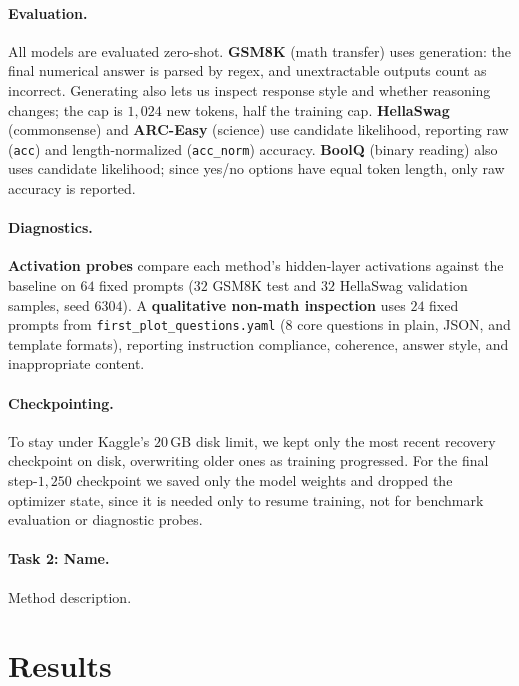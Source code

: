 \documentclass{article}
\begin{document}
\paragraph{Evaluation.}
All models are evaluated zero-shot. \textbf{GSM8K} (math transfer) uses generation: the final numerical answer is parsed by regex, and unextractable outputs count as incorrect. Generating also lets us inspect response style and whether reasoning changes; the cap is $1{,}024$ new tokens, half the training cap. \textbf{HellaSwag} (commonsense) and \textbf{ARC-Easy} (science) use candidate likelihood, reporting raw (\texttt{acc}) and length-normalized (\texttt{acc\_norm}) accuracy. \textbf{BoolQ} (binary reading) also uses candidate likelihood; since yes/no options have equal token length, only raw accuracy is reported.

\paragraph{Diagnostics.}
\textbf{Activation probes} compare each method's hidden-layer activations against the baseline on $64$ fixed prompts ($32$ GSM8K test and $32$ HellaSwag validation samples, seed $6304$). A \textbf{qualitative non-math inspection} uses $24$ fixed prompts from \texttt{first\_plot\_questions.yaml} ($8$ core questions in plain, JSON, and template formats), reporting instruction compliance, coherence, answer style, and inappropriate content.

\paragraph{Checkpointing.}
To stay under Kaggle's $20$\,GB disk limit, we kept only the most recent recovery checkpoint on disk, overwriting older ones as training progressed. For the final step-$1{,}250$ checkpoint we saved only the model weights and dropped the optimizer state, since it is needed only to resume training, not for benchmark evaluation or diagnostic probes.

\paragraph{Task 2: Name.}
Method description.

\section{Results}
\end{document}
